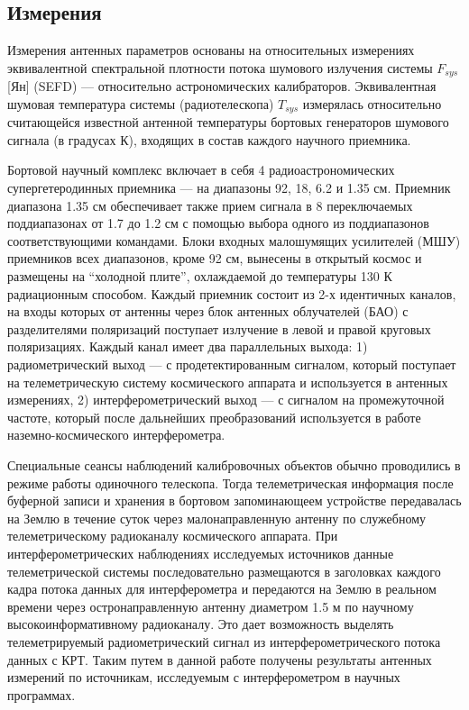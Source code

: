 \subsection{Измерения}

Измерения антенных параметров основаны на относительных измерениях эквивалентной спектральной
плотности потока шумового излучения системы $F_{sys}$ [Ян] (SEFD) --- относительно астрономических
калибраторов. Эквивалентная шумовая температура системы (радиотелескопа) $T_{sys}$ измерялась
относительно считающейся известной антенной температуры бортовых генераторов шумового сигнала (в
градусах К), входящих в состав каждого научного приемника.

Бортовой научный комплекс включает в себя 4 радиоастрономических супергетеродинных приемника --- на
диапазоны 92, 18, 6.2 и 1.35 см. Приемник диапазона 1.35 см обеспечивает также прием сигнала в 8
переключаемых поддиапазонах от 1.7 до 1.2 см с помощью выбора одного из поддиапазонов
соответствующими командами. Блоки входных малошумящих усилителей (МШУ) приемников всех диапазонов,
кроме 92 см, вынесены в открытый космос и размещены на ``холодной плите'', охлаждаемой до
температуры 130 К радиационным способом. Каждый приемник состоит из 2-х идентичных каналов, на входы
которых от антенны через блок антенных облучателей (БАО) с разделителями поляризаций поступает
излучение в левой и правой круговых поляризациях. Каждый канал имеет два параллельных выхода: 1)
радиометрический выход --- с продетектированным сигналом, который поступает на телеметрическую
систему космического аппарата и используется в антенных измерениях, 2) интерферометрический выход
--- с сигналом на промежуточной частоте, который после дальнейших преобразований используется в
работе наземно-космического интерферометра.

Специальные сеансы наблюдений калибровочных объектов обычно проводились в режиме работы одиночного
телескопа. Тогда телеметрическая информация после буферной записи и хранения в бортовом
запоминающеем устройстве передавалась на Землю в течение суток через малонаправленную антенну по
служебному телеметрическому радиоканалу космического аппарата. При интерферометрических наблюдениях
исследуемых источников данные телеметрической системы последовательно размещаются в заголовках
каждого кадра потока данных для интерферометра и передаются на Землю в реальном времени через
остронаправленную антенну диаметром 1.5 м по научному высокоинформативному радиоканалу. Это дает
возможность выделять телеметрируемый радиометрический сигнал из интерферометрического потока данных
с КРТ. Таким путем в данной работе получены результаты антенных измерений по источникам, исследуемым
с интерферометром в научных программах.


